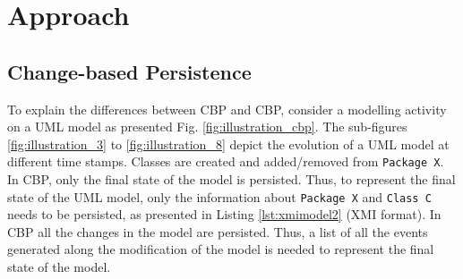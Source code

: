 \documentclass[sigplan,review,anonymous]{acmart}\settopmatter{printfolios=true,printccs=false,printacmref=false}
\begin{document}
\section{Approach}

\subsection{Change-based Persistence}
To explain the differences between CBP and CBP, consider a modelling activity on a UML model as presented Fig. \ref{fig:illustration_cbp}. The sub-figures \ref{fig:illustration_3} to \ref{fig:illustration_8} depict the evolution of a UML model at different time stamps. Classes are created and added/removed from \texttt{Package X}. In CBP, only the final state of the model is persisted. Thus, to represent the final state of the UML model, only the information about \texttt{Package X} and \texttt{Class C} needs to be persisted, as presented in Listing \ref{lst:xmimodel2} (XMI format). In CBP all the changes in the model are persisted. Thus, a list of all the events generated along the modification of the model is needed to represent the final state of the model.
\end{document}
